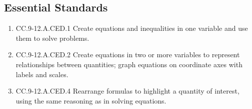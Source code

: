 \subsection*{Essential Standards}
\begin{enumerate}

	\item CC.9-12.A.CED.1  Create equations and inequalities in one variable and use them to solve problems. 
	\item CC.9-12.A.CED.2  Create equations in two or more variables to represent relationships between quantities; graph equations on coordinate axes with labels and scales.
	\item CC.9-12.A.CED.4  Rearrange formulas to highlight a quantity of interest, using the same reasoning as in solving equations. 








\end{enumerate}
